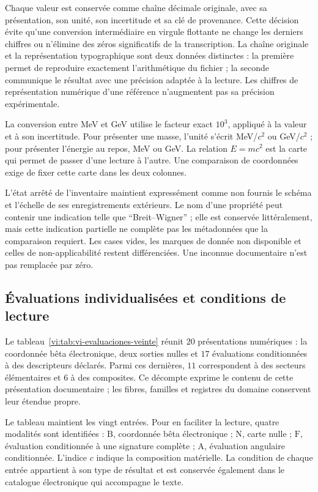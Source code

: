 Chaque valeur est conservée comme chaîne décimale originale, avec sa
présentation, son unité, son incertitude et sa clé de provenance. Cette décision
évite qu’une conversion intermédiaire en virgule flottante ne change les derniers
chiffres ou n’élimine des zéros significatifs de la transcription. La chaîne
originale et la représentation typographique sont deux données distinctes : la
première permet de reproduire exactement l’arithmétique du fichier ; la
seconde communique le résultat avec une précision adaptée à la lecture.
Les chiffres de représentation numérique d’une référence n’augmentent pas sa
précision expérimentale.

La conversion entre MeV et GeV utilise le facteur exact \(10^3\), appliqué
à la valeur et à son incertitude. Pour présenter une masse, l'unité s'écrit
MeV/\(c^2\) ou GeV/\(c^2\) ; pour présenter l'énergie au repos,
MeV ou GeV. La relation \(E=mc^2\) est la carte qui permet de passer d'une
lecture à l'autre. Une comparaison de coordonnées exige de fixer cette carte dans
les deux colonnes.

L’état arrêté de l’inventaire maintient expressément comme non fournis le
schéma et l’échelle de ses enregistrements extérieurs. Le nom d’une propriété
peut contenir une indication telle que ``Breit--Wigner'' ; elle est conservée littéralement,
mais cette indication partielle ne complète pas les métadonnées que la comparaison
requiert. Les cases vides, les marques de donnée non disponible et celles de
non-applicabilité restent différenciées. Une inconnue documentaire
n’est pas remplacée par zéro.

\subsection{Évaluations individualisées et conditions de lecture}
\label{vi:subsec:vi-evaluaciones-documentadas}

Le tableau~\ref{vi:tab:vi-evaluaciones-veinte} réunit \(20\) présentations
numériques : la coordonnée bêta électronique, deux sorties nulles et
\(17\) évaluations conditionnées à des descripteurs déclarés. Parmi
ces dernières, \(11\) correspondent à des secteurs élémentaires et \(6\) à des
composites. Ce décompte exprime le contenu de cette présentation documentaire ;
les fibres, familles et registres du domaine conservent leur étendue propre.

Le tableau maintient les vingt entrées. Pour en faciliter la lecture,
quatre modalités sont identifiées : \(\mathrm{B}\), coordonnée bêta
électronique ; \(\mathrm{N}\), carte nulle ; \(\mathrm{F}\), évaluation
conditionnée à une signature complète ; \(\mathrm{A}\), évaluation angulaire
conditionnée. L'indice \(c\) indique la composition matérielle. La
condition de chaque entrée appartient à son type de résultat et est conservée
également dans le catalogue électronique qui accompagne le texte.

